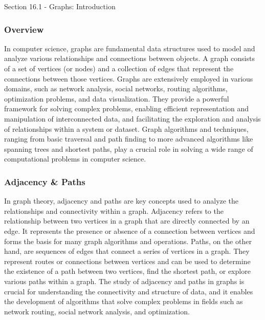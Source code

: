 \begin{notes}{Section 16.1 - Graphs: Introduction}
    \subsubsection*{Overview}

    In computer science, graphs are fundamental data structures used to model and analyze various relationships and connections between objects. A graph consists of a set of vertices (or nodes) and a 
    collection of edges that represent the connections between those vertices. Graphs are extensively employed in various domains, such as network analysis, social networks, routing algorithms, 
    optimization problems, and data visualization. They provide a powerful framework for solving complex problems, enabling efficient representation and manipulation of interconnected data, and 
    facilitating the exploration and analysis of relationships within a system or dataset. Graph algorithms and techniques, ranging from basic traversal and path finding to more advanced algorithms like 
    spanning trees and shortest paths, play a crucial role in solving a wide range of computational problems in computer science.
    
    \subsubsection*{Adjacency \& Paths}
    
    In graph theory, adjacency and paths are key concepts used to analyze the relationships and connectivity within a graph. Adjacency refers to the relationship between two vertices in a graph that are 
    directly connected by an edge. It represents the presence or absence of a connection between vertices and forms the basis for many graph algorithms and operations. Paths, on the other hand, are sequences 
    of edges that connect a series of vertices in a graph. They represent routes or connections between vertices and can be used to determine the existence of a path between two vertices, find the shortest 
    path, or explore various paths within a graph. The study of adjacency and paths in graphs is crucial for understanding the connectivity and structure of data, and it enables the development of algorithms 
    that solve complex problems in fields such as network routing, social network analysis, and optimization.
\end{notes}

